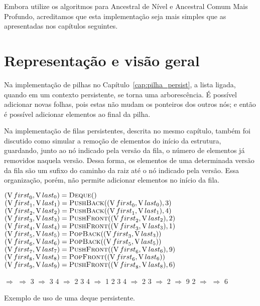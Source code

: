 \documentclass[main.tex]{subfiles}
\begin{document}
Embora utilize os algoritmos para Ancestral de Nível e Ancestral Comum Mais Profundo, acreditamos que esta implementação seja mais simples que as apresentadas nos capítulos seguintes.

\section{Representação e visão geral}

Na implementação de pilhas no Capítulo~\ref{cap:pilha_persist}, a lista ligada, quando em um contexto persistente, se torna uma arborescência. É possível adicionar novas folhas, pois estas não mudam os ponteiros dos outros nós; e então é possível adicionar elementos ao final da pilha.

Na implementação de filas persistentes, descrita no mesmo capítulo, também foi discutido como simular a remoção de elementos do início da estrutura, guardando, junto ao nó indicado pela versão da fila, o número de elementos já removidos naquela versão. Dessa forma, os elementos de uma determinada versão da fila são um sufixo do caminho da raiz até o nó indicado pela versão. Essa organização, porém, não permite adicionar elementos no início da fila.

\begin{example}[t]
\centering

\begin{subalgorithm}{0.55\textwidth}
\begin{algorithmic}

\State $(\V{first}_0, \V{last}_0) = \Call{Deque}{\null}$
\State $(\V{first}_1, \V{last}_1) = \Call{PushBack}{(\V{first}_0,\V{last}_0), 3}$
\State $(\V{first}_2, \V{last}_2) = \Call{PushBack}{(\V{first}_1,\V{last}_1), 4}$
\State $(\V{first}_3, \V{last}_3) = \Call{PushFront}{(\V{first}_2,\V{last}_2), 2}$
\State $(\V{first}_4, \V{last}_4) = \Call{PushFront}{(\V{first}_3,\V{last}_3), 1}$
\State $(\V{first}_5, \V{last}_5) = \Call{PopBack}{(\V{first}_3,\V{last}_3)}$
\State $(\V{first}_6, \V{last}_6) = \Call{PopBack}{(\V{first}_5,\V{last}_5)}$
\State $(\V{first}_7, \V{last}_7) = \Call{PushFront}{(\V{first}_6,\V{last}_6), 9}$
\State $(\V{first}_8, \V{last}_8) = \Call{PopFront}{(\V{first}_6,\V{last}_6)}$
\State $(\V{first}_9, \V{last}_9) = \Call{PushFront}{(\V{first}_8,\V{last}_8), 6}$

\end{algorithmic}
\end{subalgorithm} \vrule
\begin{subalgorithm}{0.4\textwidth}
\begin{algorithmic}

\State $\Rightarrow$
\State $\Rightarrow$ 3
\State $\Rightarrow$ 3 4
\State $\Rightarrow$ 2 3 4
\State $\Rightarrow$ 1 2 3 4
\State $\Rightarrow$ 2 3
\State $\Rightarrow$ 2
\State $\Rightarrow$ 9 2
\State $\Rightarrow$
\State $\Rightarrow$ 6

\end{algorithmic}
\end{subalgorithm}
\caption{Exemplo de uso de uma deque persistente.} \label{ex:deque}
\end{example}
\end{document}

